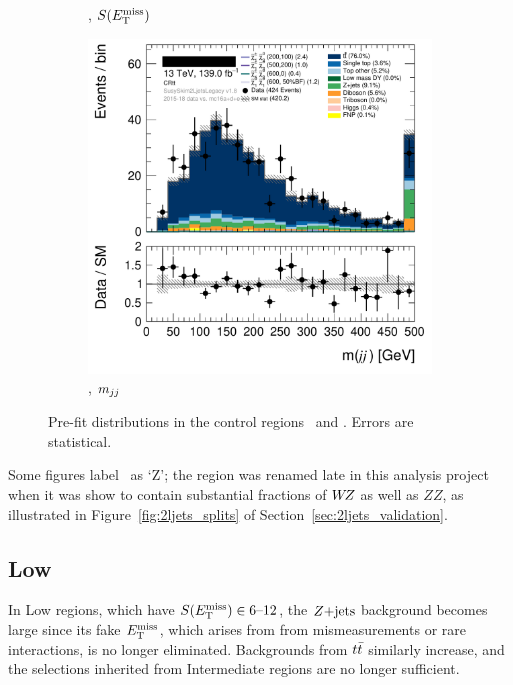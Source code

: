 \begin{figure}[tp]
\begin{subfigure}{0.48\textwidth}
\caption{\crtt, $S(E_\mathrm{T}^\mathrm{miss})$}
\end{subfigure}
\hfill
\begin{subfigure}{0.48\textwidth}
\centering
\includegraphics[width=\textwidth]{figures/2ljets_def_mjj_CRtt.png}
\caption{\crtt, $m_{jj}$}
\end{subfigure}
\caption[
Pre-fit distributions in the control regions CR-tt and CR-VZ
]{%
Pre-fit distributions in the control regions \crtt\ and \crvz.
Errors are statistical.
}
\label{fig:2ljets_int_cr_region}
\end{figure}

Some figures label \crvz\ as `\crz Z'; the region was renamed late in this
analysis project when it was show to contain substantial fractions of
$W\kern-0.4exZ$ as well as $ZZ$, as illustrated in
Figure~\ref{fig:2ljets_splits} of
Section~\ref{sec:2ljets_validation}.


\subsection{Low}
\label{sec:2ljets_low}
In Low regions, which have $S(E_\mathrm{T}^\mathrm{miss}) \in 6\textrm{--}12$, the $Z\mathrm{+jets}$
background becomes large since its fake $E_\mathrm{T}^\mathrm{miss}$, which arises from
from mismeasurements or rare interactions, is no longer eliminated.
Backgrounds from $t\bar t$ similarly increase, and the selections inherited from
Intermediate regions are no longer sufficient.

